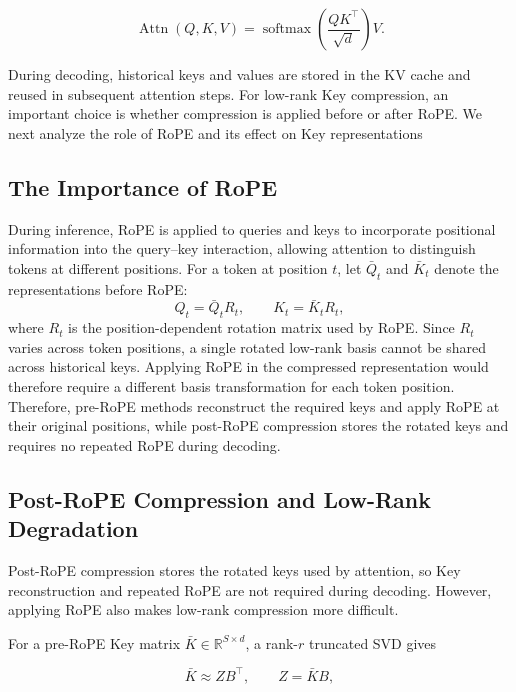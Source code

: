 \documentclass{article} %
\begin{document}
\begin{equation}
    \operatorname{Attn}(Q,K,V)
    =
    \operatorname{softmax}
    \left(
    \frac{QK^\top}{\sqrt d}
    \right)V.
\end{equation}

During decoding, historical keys and values are stored in the KV cache and
reused in subsequent attention steps. For low-rank Key compression, an
important choice is whether compression is applied before or after RoPE.
We next analyze the role of RoPE and its effect on Key representations

\subsection{The Importance of RoPE}


During inference, RoPE is applied to queries and keys to incorporate positional
information into the query--key interaction, allowing attention to distinguish
tokens at different positions. For a token
at position $t$, let $\bar Q_t$ and $\bar K_t$ denote the representations
before RoPE:
\begin{equation}
    Q_t=\bar Q_tR_t,\qquad
    K_t=\bar K_tR_t,
\end{equation}
where $R_t$ is the position-dependent rotation matrix used by RoPE. Since $R_t$ varies across token positions, a single rotated low-rank basis
cannot be shared across historical keys. Applying RoPE in the compressed
representation would therefore require a different basis transformation for
each token position. Therefore, pre-RoPE methods reconstruct the required keys and apply RoPE at
their original positions, while post-RoPE compression stores the rotated keys
and requires no repeated RoPE during decoding.

\subsection{Post-RoPE Compression and Low-Rank Degradation}

Post-RoPE compression stores the rotated keys used by attention, so Key
reconstruction and repeated RoPE are not required during decoding. However,
applying RoPE also makes low-rank compression more difficult.

For a pre-RoPE Key matrix
$\bar K\in\mathbb{R}^{S\times d}$, a rank-$r$ truncated SVD gives

\begin{equation}
    \bar K \approx ZB^\top,
    \qquad
    Z=\bar K B,
\end{equation}
\end{document}
